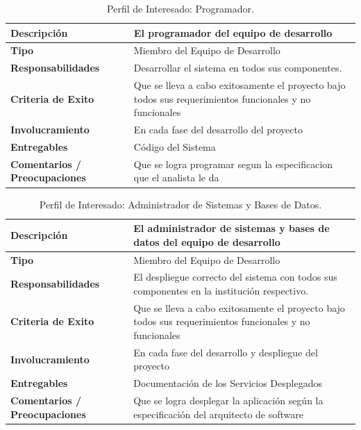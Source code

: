 \vfill

\begin{table}[h!]
  \begin{tabular}{|p{}|p{}|}
    \hline
    \textbf{Descripción} & El programador del equipo de desarrollo \\
    \hline
    \textbf{Tipo} & Miembro del Equipo de Desarrollo \\
    \hline
    \textbf{Responsabilidades} & Desarrollar el sistema en todos sus componentes. \\
    \hline
    \textbf{Criteria de Exito} & Que se lleva a cabo exitosamente el proyecto bajo todos sus requerimientos funcionales y no funcionales \\
    \hline
    \textbf{Involucramiento} & En cada fase del desarrollo del proyecto \\
    \hline
    \textbf{Entregables} & Código del Sistema \\
    \hline
    \textbf{Comentarios / Preocupaciones} & Que se logra programar segun la especificacion que el analista le da \\
    \hline
  \end{tabular}
  \caption{Perfil de Interesado: Programador.}
  \label{per-inter-programer}
\end{table}

\pagebreak

\begin{table}[h!]
  \begin{tabular}{|p{}|p{}|}
    \hline
    \textbf{Descripción} & El administrador de sistemas y bases de datos del equipo de desarrollo \\
    \hline
    \textbf{Tipo} & Miembro del Equipo de Desarrollo \\
    \hline
    \textbf{Responsabilidades} & El despliegue correcto del sistema con todos sus componentes en la institución respectivo. \\
    \hline
    \textbf{Criteria de Exito} & Que se lleva a cabo exitosamente el proyecto bajo todos sus requerimientos funcionales y no funcionales \\
    \hline
    \textbf{Involucramiento} & En cada fase del desarrollo y despliegue del proyecto \\
    \hline
    \textbf{Entregables} & Documentación de los Servicios Desplegados \\
    \hline
    \textbf{Comentarios / Preocupaciones} & Que se logra desplegar la aplicación según la especificación del arquitecto de software \\
    \hline
  \end{tabular}
  \caption{Perfil de Interesado: Administrador de Sistemas y Bases de Datos.}
  \label{per-inter-admn}
\end{table}

